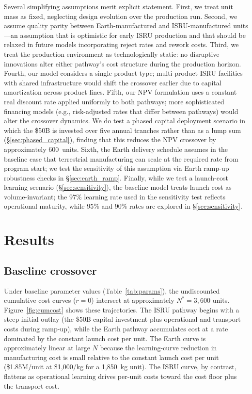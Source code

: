 \documentclass[preprint,12pt]{elsarticle}
\begin{document}
Several simplifying assumptions merit explicit statement. First, we treat unit mass as fixed, neglecting design evolution over the production run. Second, we assume quality parity between Earth-manufactured and ISRU-manufactured units---an assumption that is optimistic for early ISRU production and that should be relaxed in future models incorporating reject rates and rework costs. Third, we treat the production environment as technologically static: no disruptive innovations alter either pathway's cost structure during the production horizon. Fourth, our model considers a single product type; multi-product ISRU facilities with shared infrastructure would shift the crossover earlier due to capital amortization across product lines. Fifth, our NPV formulation uses a constant real discount rate applied uniformly to both pathways; more sophisticated financing models (e.g., risk-adjusted rates that differ between pathways) would alter the crossover dynamics. We do test a phased capital deployment scenario in which the \$50B is invested over five annual tranches rather than as a lump sum (\S\ref{sec:phased_capital}), finding that this reduces the NPV crossover by approximately 600~units. Sixth, the Earth delivery schedule assumes in the baseline case that terrestrial manufacturing can scale at the required rate from program start; we test the sensitivity of this assumption via Earth ramp-up robustness checks in \S\ref{sec:earth_ramp}. Finally, while we test a launch-cost learning scenario (\S\ref{sec:sensitivity}), the baseline model treats launch cost as volume-invariant; the 97\% learning rate used in the sensitivity test reflects operational maturity, while 95\% and 90\% rates are explored in \S\ref{sec:sensitivity}.

\section{Results}
\label{sec:results}

\subsection{Baseline crossover}

Under baseline parameter values (Table~\ref{tab:params}), the undiscounted cumulative cost curves ($r = 0$) intersect at approximately $N^* = 3{,}600$ units. Figure~\ref{fig:cumcost} shows these trajectories. The ISRU pathway begins with a steep initial outlay (the \$50B capital investment plus operational and transport costs during ramp-up), while the Earth pathway accumulates cost at a rate dominated by the constant launch cost per unit. The Earth curve is approximately linear at large $N$ because the learning-curve reduction in manufacturing cost is small relative to the constant launch cost per unit (\$1.85M/unit at \$1{,}000/kg for a 1{,}850~kg unit). The ISRU curve, by contrast, flattens as operational learning drives per-unit costs toward the cost floor plus the transport cost.
\end{document}
